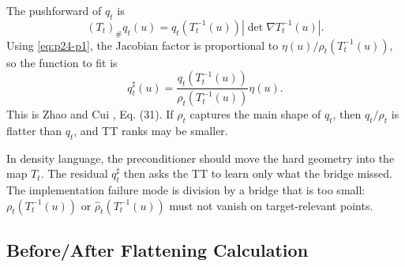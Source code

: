 \documentclass[11pt]{article}
\numberwithin{equation}{section}
\begin{document}
The pushforward of \(q_t\) is
\[
    (T_t)_\#q_t(u)
    =
    q_t(T_t^{-1}(u))
    \left|\det\nabla T_t^{-1}(u)\right|.
\]
Using \eqref{eq:p24-p1}, the Jacobian factor is proportional to
\(\eta(u)/\rho_t(T_t^{-1}(u))\), so the function to fit is
\begin{equation}
    q^\sharp_t(u)
    =
    \frac{q_t(T_t^{-1}(u))}
    {\rho_t(T_t^{-1}(u))}
    \eta(u).
    \label{eq:p24-p2}
\end{equation}
This is Zhao and Cui \cite{zhao2024ttsequential}, Eq. (31).  If \(\rho_t\) captures the main shape of \(q_t\),
then \(q_t/\rho_t\) is flatter than \(q_t\), and TT ranks may be smaller.

In density language, the preconditioner should move the hard geometry into the
map \(T_t\).  The residual \(q_t^\sharp\) then asks the TT to learn only what
the bridge missed.  The implementation failure mode is division by a bridge
that is too small: \(\rho_t(T_t^{-1}(u))\) or \(\widehat\rho_t(T_t^{-1}(u))\)
must not vanish on target-relevant points.

\subsection*{Before/After Flattening Calculation}
\end{document}
